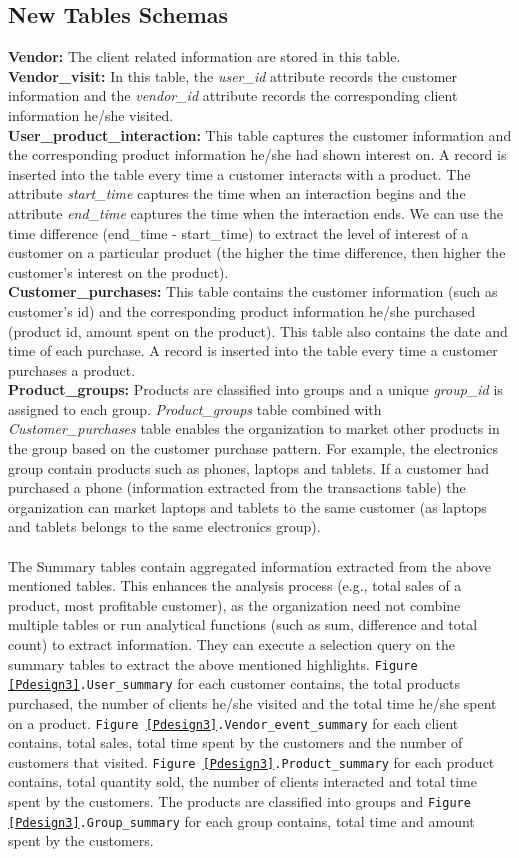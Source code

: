\subsection{New Tables Schemas}
\textbf{Vendor: }The client related information are stored in this table.\\
\textbf{Vendor\_visit: }In this table, the \emph{user\_id} attribute records the customer information and the \emph{vendor\_id} attribute records the corresponding client information he/she visited.\\
\textbf{User\_product\_interaction: }This table captures the customer information and the corresponding product information he/she had shown interest on. A record is inserted into the table every time a customer interacts with a product. The attribute \emph{start\_time} captures the time when an interaction begins and the attribute \emph{end\_time} captures the time when the interaction ends. We can use the time difference (end\_time - start\_time) to extract the level of interest of a customer on a particular product (the higher the time difference, then higher the customer's interest on the product).\\
\textbf{Customer\_purchases: }This table contains the customer information (such as customer's id) and the corresponding product information he/she purchased (product id, amount spent on the product). This table also contains the date and time of each purchase. A record is inserted into the table every time a customer purchases a product.\\
\textbf{Product\_groups: }Products are classified into groups and a unique \emph{group\_id} is assigned to each group. \emph{Product\_groups} table combined with \emph{Customer\_purchases} table enables the organization to market other products in the group based on the customer purchase pattern. For example, the electronics group contain products such as phones, laptops and tablets. If a customer had purchased a phone (information extracted from the transactions table) the organization can  market laptops and tablets to the same customer (as laptops and tablets belongs to the same electronics group).\\\\
The Summary tables contain aggregated information extracted from the above mentioned tables. This enhances the analysis process (e.g., total sales of a product, most profitable customer), as  the organization need not combine multiple tables or run analytical functions (such as sum, difference and total count) to extract information. They can execute a selection query on the summary tables to extract the above mentioned highlights. \texttt{Figure \ref{Pdesign3}.User\_summary} for each customer contains, the total products purchased, the number of clients he/she visited and the total time he/she spent on a product. \texttt{Figure \ref{Pdesign3}.Vendor\_event\_summary} for each client contains, total sales, total time spent by the customers and the number of customers that visited. \texttt{Figure \ref{Pdesign3}.Product\_summary} for each product contains, total quantity sold, the number of clients interacted and total time spent by the customers. The products are classified into groups and \texttt{Figure \ref{Pdesign3}.Group\_summary} for each group contains, total time and amount spent by the customers.
